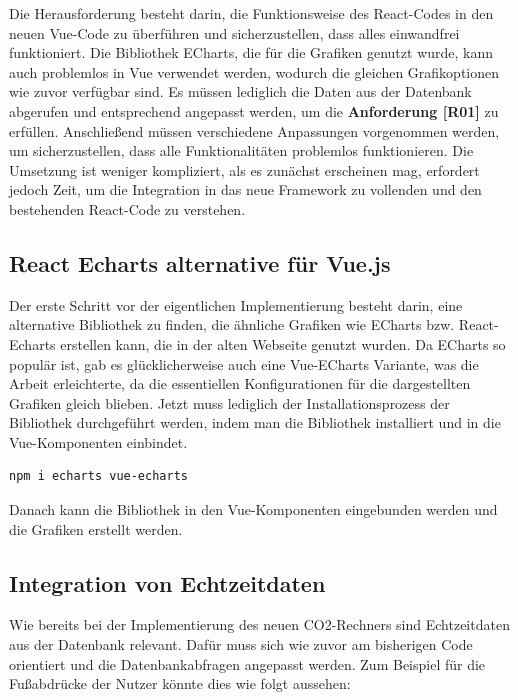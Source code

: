 Die Herausforderung besteht darin, die Funktionsweise des React-Codes in den neuen Vue-Code zu überführen und sicherzustellen, dass alles einwandfrei funktioniert. Die Bibliothek ECharts, die für die Grafiken genutzt wurde, kann auch problemlos in Vue verwendet werden, wodurch die gleichen Grafikoptionen wie zuvor verfügbar sind. Es müssen lediglich die Daten aus der Datenbank abgerufen und entsprechend angepasst werden, um die \textbf{Anforderung [R01]} zu erfüllen.
Anschließend müssen verschiedene Anpassungen vorgenommen werden, um sicherzustellen, dass alle Funktionalitäten problemlos funktionieren.
Die Umsetzung ist weniger kompliziert, als es zunächst erscheinen mag, erfordert jedoch Zeit, um die Integration in das neue Framework zu vollenden und den bestehenden React-Code zu verstehen.

\subsection{React Echarts alternative für Vue.js}

Der erste Schritt vor der eigentlichen Implementierung besteht darin, eine alternative Bibliothek zu finden, die ähnliche Grafiken wie ECharts bzw. React-Echarts erstellen kann, die in der alten Webseite genutzt wurden. Da ECharts so populär ist, gab es glücklicherweise auch eine Vue-ECharts Variante, was die Arbeit erleichterte, da die essentiellen Konfigurationen für die dargestellten Grafiken gleich blieben. Jetzt muss lediglich der Installationsprozess der Bibliothek durchgeführt werden, indem man die Bibliothek installiert und in die Vue-Komponenten einbindet.

\begin{lstlisting}[language={bash}, caption={Installation von Vue-ECharts}]
npm i echarts vue-echarts
\end{lstlisting}

Danach kann die Bibliothek in den Vue-Komponenten eingebunden werden und die Grafiken erstellt werden. \cite{vue-echarts}

\subsection{Integration von Echtzeitdaten}

Wie bereits bei der Implementierung des neuen CO2-Rechners sind Echtzeitdaten aus der Datenbank relevant. Dafür muss sich wie zuvor am bisherigen Code orientiert und die Datenbankabfragen angepasst werden. Zum Beispiel für die Fußabdrücke der Nutzer könnte dies wie folgt aussehen:

